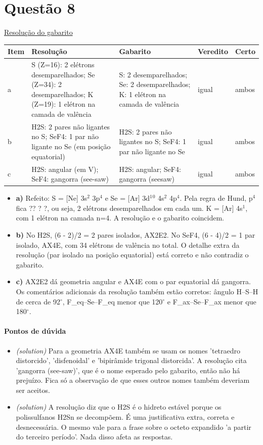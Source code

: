 \documentclass{article}%
\begin{document}
\section*{Questão 8}%
\href{https://poliedroresolve.sistemapoliedro.com.br/vestibulares/ita/2027/ita-2-fase-dia-2-21-10-2026-2-fase-dia-2/dissertativa-8-quimica-2-fase-dia-2-ita-2027}{Resolução do gabarito}\par\smallskip%
\begin{longtable}{@{}p{} p{} p{} p{} p{}@{}}\toprule Item & Resolução & Gabarito & Veredito & Certo \\ \midrule
a & S (Z=16): 2 elétrons desemparelhados; Se (Z=34): 2 desemparelhados; K (Z=19): 1 elétron na camada de valência & S: 2 desemparelhados; Se: 2 desemparelhados; K: 1 elétron na camada de valência & igual & ambos \\
b & H2S: 2 pares não ligantes no S; SeF4: 1 par não ligante no Se (em posição equatorial) & H2S: 2 pares não ligantes no S; SeF4: 1 par não ligante no Se & igual & ambos \\
c & H2S: angular (em V); SeF4: gangorra (see{-}saw) & H2S: angular; SeF4: gangorra (seesaw) & igual & ambos \\
\bottomrule\end{longtable}%
\begin{itemize}%
\item%
\textbf{a)} Refeito: S = {[}Ne{]} 3s$^2$ 3p$^{4}$ e Se = {[}Ar{]} 3d$^{1}$$^{0}$ 4s$^2$ 4p$^{4}$. Pela regra de Hund, p$^{4}$ fica ?? ? ?, ou seja, 2 elétrons desemparelhados em cada um. K = {[}Ar{]} 4s$^{1}$, com 1 elétron na camada n=4. A resolução e o gabarito coincidem.%
\item%
\textbf{b)} No H2S, (6 - 2)/2 = 2 pares isolados, AX2E2. No SeF4, (6 - 4)/2 = 1 par isolado, AX4E, com 34 elétrons de valência no total. O detalhe extra da resolução (par isolado na posição equatorial) está correto e não contradiz o gabarito.%
\item%
\textbf{c)} AX2E2 dá geometria angular e AX4E com o par equatorial dá gangorra. Os comentários adicionais da resolução também estão corretos: ângulo H--S--H de cerca de 92$^\circ$, F\_eq--Se--F\_eq menor que 120$^\circ$ e F\_ax--Se--F\_ax menor que 180$^\circ$.%
\end{itemize}%
\paragraph{Pontos de dúvida}%
\begin{itemize}%
\item%
\textit{(solution)} Para a geometria AX4E também se usam os nomes 'tetraedro distorcido', 'disfenoidal' e 'bipirâmide trigonal distorcida'. A resolução cita 'gangorra (see{-}saw)', que é o nome esperado pelo gabarito, então não há prejuízo. Fica só a observação de que esses outros nomes também deveriam ser aceitos.%
\item%
\textit{(solution)} A resolução diz que o H2S é o hidreto estável porque os polissulfanos H2Sn se decompõem. É uma justificativa extra, correta e desnecessária. O mesmo vale para a frase sobre o octeto expandido 'a partir do terceiro período'. Nada disso afeta as respostas.%
\end{itemize}%
\end{document}

